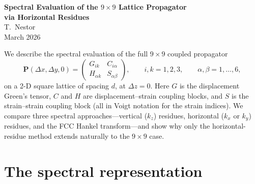 \documentclass[11pt,a4paper]{article}
\newcommand{\bP}{\mathbf{P}}
\begin{document}
\thispagestyle{plain}
\begin{center}
  {\LARGE\bfseries Spectral Evaluation of the $9\times 9$ Lattice Propagator\\[4pt]
  via Horizontal Residues}\\[12pt]
  {\large T.\ Nestor}\\[4pt]
  {\small March 2026}
\end{center}

\bigskip
\noindent
We describe the spectral evaluation of the full $9\times 9$ coupled
propagator
\[
  \bP(\Delta x, \Delta y, 0) =
  \begin{pmatrix}
    G_{ik} & C_{i\alpha} \\
    H_{\alpha k} & S_{\alpha\beta}
  \end{pmatrix},
  \qquad
  i,k = 1,2,3, \qquad \alpha,\beta = 1,\dots,6,
\]
on a 2-D square lattice of spacing $d$, at $\Delta z = 0$.
Here $G$ is the displacement Green's tensor, $C$ and $H$ are
displacement--strain coupling blocks, and $S$ is the strain--strain
coupling block (all in Voigt notation for the strain indices).
We compare three spectral approaches---vertical ($k_z$)
residues, horizontal ($k_x$ or $k_y$) residues, and the FCC
Hankel transform---and show why only the horizontal-residue
method extends naturally to the $9\times 9$ case.


\section{The spectral representation}\label{sec:spectral}
\end{document}
